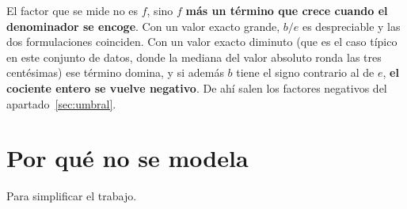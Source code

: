 \noindent El factor que se mide no es $f$, sino $f$ \textbf{más un término que crece cuando el
denominador se encoge}. Con un valor exacto grande, $b/e$ es despreciable y las dos
formulaciones coinciden. Con un valor exacto diminuto (que es el caso típico en este conjunto
de datos, donde la mediana del valor absoluto ronda las tres centésimas) ese término domina, y
si además $b$ tiene el signo contrario al de $e$, \textbf{el cociente entero se vuelve
negativo}. De ahí salen los factores negativos del apartado~\ref{sec:umbral}.

\section{Por qué no se modela}

Para simplificar el trabajo.
